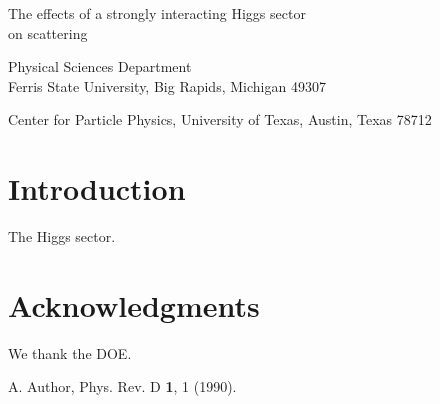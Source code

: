 
\draft
{}
\begin{title}
The effects of a strongly interacting Higgs sector\\
on scattering
\end{title}
\author{A. Abbasabadi}
\begin{instit}
Physical Sciences Department\\
Ferris State University, Big Rapids, Michigan 49307
\end{instit}
\author{David Bowser-Chao}
\begin{instit}
Center for Particle Physics, University of Texas, Austin, Texas 78712
\end{instit}
\begin{abstract}
We study the effects of a strongly interacting Higgs sector.
\end{abstract}
\narrowtext
\section{Introduction}
The Higgs sector.
\nonum
\narrowtext
\section{Acknowledgments}
We thank the DOE.
\begin{references}
 A. Author, Phys. Rev. D {\bf 1}, 1 (1990).
\end{references}


